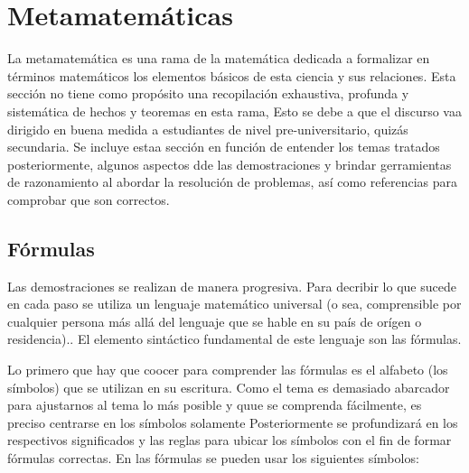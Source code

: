



\section{Metamatemáticas}

La metamatemática es una rama de la matemática dedicada a formalizar en términos matemáticos los elementos básicos de esta ciencia y sus relaciones. Esta sección no tiene como propósito una recopilación exhaustiva, profunda y sistemática  de hechos y teoremas en esta rama, Esto se debe a que el discurso vaa dirigido en buena medida a estudiantes de nivel pre-universitario, quizás secundaria. Se incluye estaa sección en función de entender los temas tratados posteriormente, algunos aspectos dde las demostraciones y brindar gerramientas de razonamiento al abordar la resolución de problemas, así como referencias para comprobar que son correctos.

\subsection{Fórmulas}

Las demostraciones se realizan de manera progresiva. Para decribir lo que sucede en cada paso se utiliza un lenguaje matemático universal (o sea, comprensible por cualquier persona más allá del lenguaje que se hable en su país de orígen o residencia).. El elemento sintáctico fundamental de este lenguaje son las fórmulas.

Lo primero que hay que coocer para comprender las fórmulas es el alfabeto (los símbolos) que se utilizan en su escritura. Como el tema es demasiado abarcador para ajustarnos al tema lo más posible y quue se comprenda fácilmente, es preciso centrarse en los símbolos solamente  Posteriormente se profundizará en los respectivos significados y las reglas para ubicar los símbolos con el fin de formar fórmulas correctas. En las fórmulas se pueden usar los siguientes símbolos:

